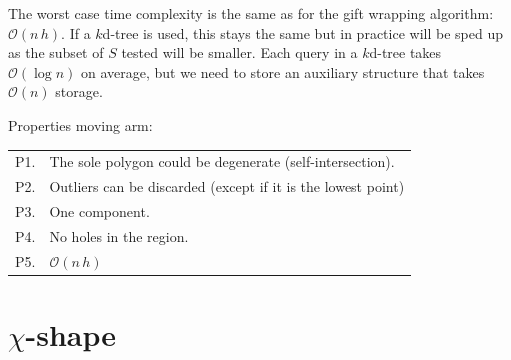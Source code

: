 %

The worst case time complexity is the same as for the gift wrapping algorithm: $\mathcal{O}(n \, h)$.
If a $k$d-tree is used, this stays the same but in practice will be sped up as the subset of $S$ tested will be smaller. 
Each query in a $k$d-tree takes $\mathcal{O}(\log n)$ on average, but we need to store an auxiliary structure that takes $\mathcal{O}(n)$ storage.

Properties moving arm:
\\
\begin{tabular}{@{}ll@{}}
\toprule
  P1. & The sole polygon could be degenerate (self-intersection).  \\  
  P2. & Outliers can be discarded (except if it is the lowest point) \\
  P3. & One component.  \\ 
  P4. & No holes in the region.  \\  
  P5. & $\mathcal{O}(n \, h)$  \\  
\bottomrule
\end{tabular}


\newpage
%
\section{$\chi$-shape}

